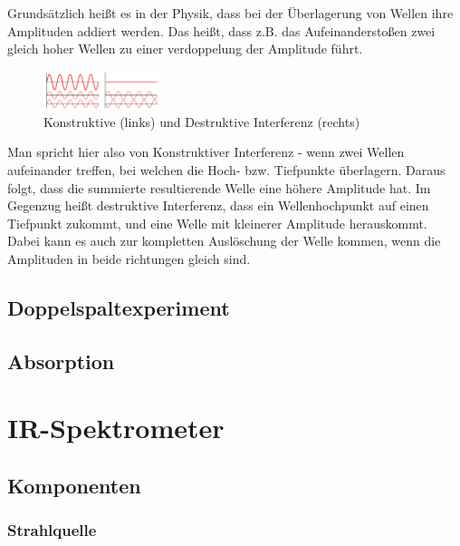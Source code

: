\documentclass{article}
\begin{document}
Grundsätzlich heißt es in der Physik, dass bei der Überlagerung von Wellen ihre Amplituden addiert werden. Das heißt, dass z.B. das Aufeinanderstoßen zwei gleich hoher Wellen zu einer verdoppelung der Amplitude führt.

\begin{figure}
    \centering
    \includegraphics[width=0.3\textwidth]{interferenz.png}
    \caption{Konstruktive (links) und Destruktive Interferenz (rechts)}
\end{figure}
Man spricht hier also von Konstruktiver Interferenz - wenn zwei Wellen aufeinander treffen, bei welchen die Hoch- bzw. Tiefpunkte überlagern. Daraus folgt, dass die summierte resultierende Welle eine höhere Amplitude hat. Im Gegenzug heißt destruktive Interferenz, dass ein Wellenhochpunkt auf einen Tiefpunkt zukommt, und eine Welle mit kleinerer Amplitude herauskommt. Dabei kann es auch zur kompletten Auslöschung der Welle kommen, wenn die Amplituden in beide richtungen gleich sind.

\subsection{Doppelspaltexperiment}


\subsection{Absorption}


\section{IR-Spektrometer}


\subsection{Komponenten}

\subsubsection{Strahlquelle}
\end{document}
